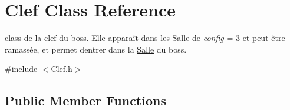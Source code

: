 \hypertarget{classClef}{}\section{Clef Class Reference}
\label{classClef}


class de la clef du boss. Elle apparaît dans les \hyperlink{classSalle}{Salle} de {\itshape config} = 3 et peut être ramassée, et permet d\textquotesingle{}entrer dans la \hyperlink{classSalle}{Salle} du boss.  




{\ttfamily \#include $<$Clef.\+h$>$}

\subsection*{Public Member Functions}
